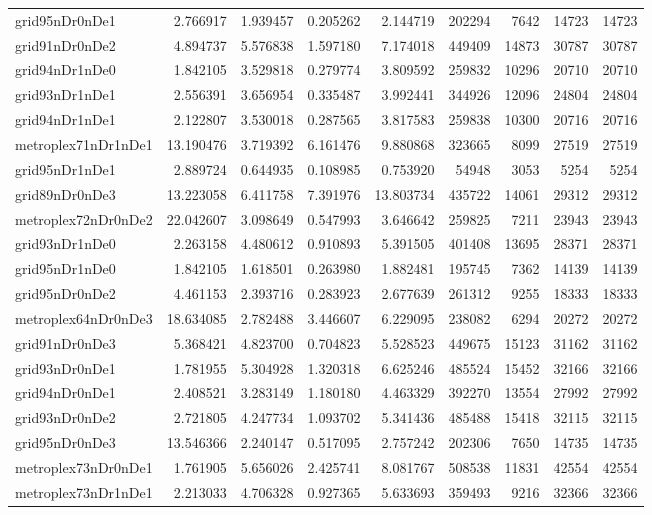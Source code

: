 \begin{longtable}{|l|r|r|r|r|r|r|r|r|}
grid95nDr0nDe1 & 2.766917 & 1.939457 & 0.205262 & 2.144719 & 202294 & 7642 & 14723 & 14723 \\
grid91nDr0nDe2 & 4.894737 & 5.576838 & 1.597180 & 7.174018 & 449409 & 14873 & 30787 & 30787 \\
grid94nDr1nDe0 & 1.842105 & 3.529818 & 0.279774 & 3.809592 & 259832 & 10296 & 20710 & 20710 \\
grid93nDr1nDe1 & 2.556391 & 3.656954 & 0.335487 & 3.992441 & 344926 & 12096 & 24804 & 24804 \\
grid94nDr1nDe1 & 2.122807 & 3.530018 & 0.287565 & 3.817583 & 259838 & 10300 & 20716 & 20716 \\
metroplex71nDr1nDe1 & 13.190476 & 3.719392 & 6.161476 & 9.880868 & 323665 & 8099 & 27519 & 27519 \\
grid95nDr1nDe1 & 2.889724 & 0.644935 & 0.108985 & 0.753920 & 54948 & 3053 & 5254 & 5254 \\
grid89nDr0nDe3 & 13.223058 & 6.411758 & 7.391976 & 13.803734 & 435722 & 14061 & 29312 & 29312 \\
metroplex72nDr0nDe2 & 22.042607 & 3.098649 & 0.547993 & 3.646642 & 259825 & 7211 & 23943 & 23943 \\
grid93nDr1nDe0 & 2.263158 & 4.480612 & 0.910893 & 5.391505 & 401408 & 13695 & 28371 & 28371 \\
grid95nDr1nDe0 & 1.842105 & 1.618501 & 0.263980 & 1.882481 & 195745 & 7362 & 14139 & 14139 \\
grid95nDr0nDe2 & 4.461153 & 2.393716 & 0.283923 & 2.677639 & 261312 & 9255 & 18333 & 18333 \\
metroplex64nDr0nDe3 & 18.634085 & 2.782488 & 3.446607 & 6.229095 & 238082 & 6294 & 20272 & 20272 \\
grid91nDr0nDe3 & 5.368421 & 4.823700 & 0.704823 & 5.528523 & 449675 & 15123 & 31162 & 31162 \\
grid93nDr0nDe1 & 1.781955 & 5.304928 & 1.320318 & 6.625246 & 485524 & 15452 & 32166 & 32166 \\
grid94nDr0nDe1 & 2.408521 & 3.283149 & 1.180180 & 4.463329 & 392270 & 13554 & 27992 & 27992 \\
grid93nDr0nDe2 & 2.721805 & 4.247734 & 1.093702 & 5.341436 & 485488 & 15418 & 32115 & 32115 \\
grid95nDr0nDe3 & 13.546366 & 2.240147 & 0.517095 & 2.757242 & 202306 & 7650 & 14735 & 14735 \\
metroplex73nDr0nDe1 & 1.761905 & 5.656026 & 2.425741 & 8.081767 & 508538 & 11831 & 42554 & 42554 \\
metroplex73nDr1nDe1 & 2.213033 & 4.706328 & 0.927365 & 5.633693 & 359493 & 9216 & 32366 & 32366 \\

\end{longtable}
